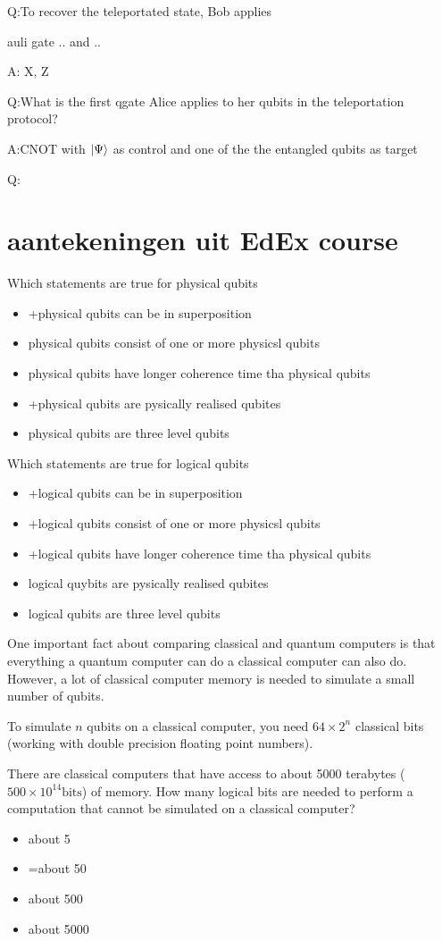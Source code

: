 \documentclass[../../main.tex]{subfiles}
\begin{document}
Q:To recover the teleportated state, Bob applies {auli gate .. and ..

A: X, Z

Q:What is the first qgate Alice applies to her qubits in the teleportation protocol?

A:CNOT with $\ket{\Psi}$ as control and one of the the entangled qubits as target 

Q:



\section*{aantekeningen uit EdEx course}
Which statements are true for physical qubits
\begin{itemize}
\item +physical qubits can be in superposition
\item physical qubits consist of one or more physicsl qubits
\item physical qubits have longer coherence time tha physical qubits
\item +physical qubits are pysically realised qubites
\item physical qubits are three level qubits
\end{itemize}

Which statements are true for logical qubits
\begin{itemize}
\item +logical qubits can be in superposition
\item +logical qubits consist of one or more physicsl qubits
\item +logical qubits have longer coherence time tha physical qubits
\item logical quybits are pysically realised qubites
\item logical qubits are three level qubits
\end{itemize}

One important fact about comparing classical and quantum computers is that everything a quantum computer can do a classical computer can also do. However, a lot of classical computer memory is needed to simulate a small number of qubits.

To simulate $n$ qubits on a classical computer, you need $64 \times 2^n$ classical bits (working with double precision floating point numbers).

There are classical computers that have access to about 5000 terabytes ($500 \times 10^{14} \mathrm{bits}$) of memory. How many logical bits are needed to perform a computation that cannot be simulated on a classical computer?
\begin{itemize}
\item about 5
\item =about 50
\item about 500
\item about 5000
\end{itemize}

}
\end{document}
